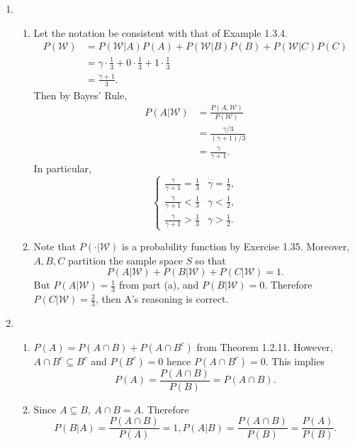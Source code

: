 \documentclass{article}
\begin{document}
\begin{enumerate}
    \item \begin{enumerate}
        \item Let the notation be consistent with that of Example 1.3.4. \begin{align*}
            P(\mathcal{W})
            &= P(\mathcal{W}|A)P(A) + P(\mathcal{W}|B)P(B) + P(\mathcal{W}|C)P(C) \\
            &= \gamma \cdot \frac{1}{3} + 0 \cdot \frac{1}{3} + 1 \cdot \frac{1}{3} \\
            &= \frac{\gamma + 1}{3}.
        \end{align*}
        Then by Bayes' Rule,
        \begin{align*}
            P(A|\mathcal{W})
            &= \frac{P(A, \mathcal{W})}{P(\mathcal{W})} \\
            &= \frac{\gamma / 3}{(\gamma + 1) / 3} \\
            &= \frac{\gamma}{\gamma + 1}.
        \end{align*}
        In particular,
        \[ \begin{cases}
            \frac{\gamma}{\gamma + 1} = \frac{1}{3} & \gamma = \frac{1}{2}, \\
            \frac{\gamma}{\gamma + 1} < \frac{1}{3} & \gamma < \frac{1}{2}, \\
            \frac{\gamma}{\gamma + 1} > \frac{1}{3} & \gamma > \frac{1}{2}.
        \end{cases} \]

        \item Note that $P(\cdot | \mathcal{W})$ is a probability function by Exercise 1.35.
        Moreover, $A, B, C$ partition the sample space $S$ so that
        \[ P(A|\mathcal{W}) + P(B|\mathcal{W}) + P(C|\mathcal{W}) = 1. \]
        But $P(A|\mathcal{W}) = \frac{1}{3}$ from part (a), and $P(B|\mathcal{W}) = 0$.
        Therefore $P(C|\mathcal{W}) = \frac{2}{3}$, then A's reasoning is correct.
    \end{enumerate}

    \item \begin{enumerate}
        \item $P(A) = P(A \cap B) + P(A \cap B^c)$ from Theorem 1.2.11. However,
        $A \cap B^{c} \subseteq B^{c}$ and $P(B^c) = 0$ hence $P(A \cap B^{c}) = 0$.
        This implies
        \[ P(A) = \frac{P(A \cap B)}{P(B)} = P(A \cap B). \]

        \item Since $A \subseteq B, \ A \cap B = A$. Therefore
        \[ P(B|A) = \frac{P(A \cap B)}{P(A)} = 1,
        P(A|B) = \frac{P(A \cap B)}{P(B)} = \frac{P(A)}{P(B)}. \]


\end{enumerate}
\end{enumerate}
\end{document}
